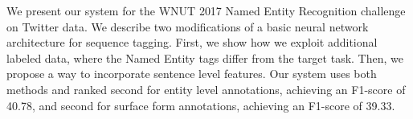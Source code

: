 We present our system for the WNUT 2017 Named Entity Recognition challenge on Twitter data. We describe two modifications of a basic neural network architecture for sequence tagging. First, we show how we exploit additional labeled data, where the Named Entity tags differ from the target task. Then, we propose a way to incorporate sentence level features. Our system uses both methods and ranked second for entity level annotations, achieving an F1-score of 40.78, and second for surface form annotations, achieving an F1-score of 39.33.

